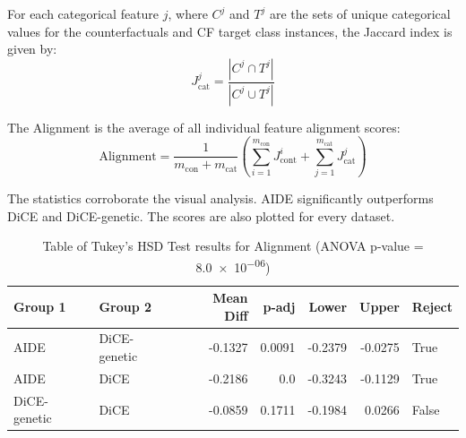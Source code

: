 For each categorical feature \( j \), where \( C^j \) and \( T^j \) are the sets of unique categorical values for the counterfactuals and CF target class instances, the Jaccard index is given by:
\begin{equation}
J_{\text{cat}}^{j} = \frac{ | C^j \cap T^j | }{ | C^j \cup T^j | }
\end{equation}

The Alignment is the average of all individual feature alignment scores:
\begin{equation}
\text{Alignment} = \frac{1}{m_{\text{con}} + m_{\text{cat}}} \left( \sum_{i=1}^{m_{\text{con}}} J_{\text{cont}}^i + \sum_{j=1}^{m_{\text{cat}}} J_{\text{cat}}^j \right)
\end{equation}

The statistics corroborate the visual analysis. AIDE significantly outperforms DiCE and DiCE-genetic. The scores are also plotted for every dataset.

\begin{table}[!htbp]
    \centering
    \begin{tabular}{llrrrrl}
        \toprule
        Group 1       & Group 2         & Mean Diff & p-adj  & Lower     & Upper     & Reject \\
        \midrule
        AIDE          & DiCE-genetic   & -0.1327   & 0.0091 & -0.2379   & -0.0275   & True   \\
        AIDE          & DiCE  & -0.2186   & 0.0    & -0.3243   & -0.1129   & True   \\
        DiCE-genetic & DiCE  & -0.0859   & 0.1711 & -0.1984   &  0.0266   & False  \\
        \bottomrule
    \end{tabular}
    \caption{Table of Tukey's HSD Test results for Alignment (ANOVA p-value = \SI{8.0e-06}{})}
    \label{tab:tukey_alignment}
\end{table}

